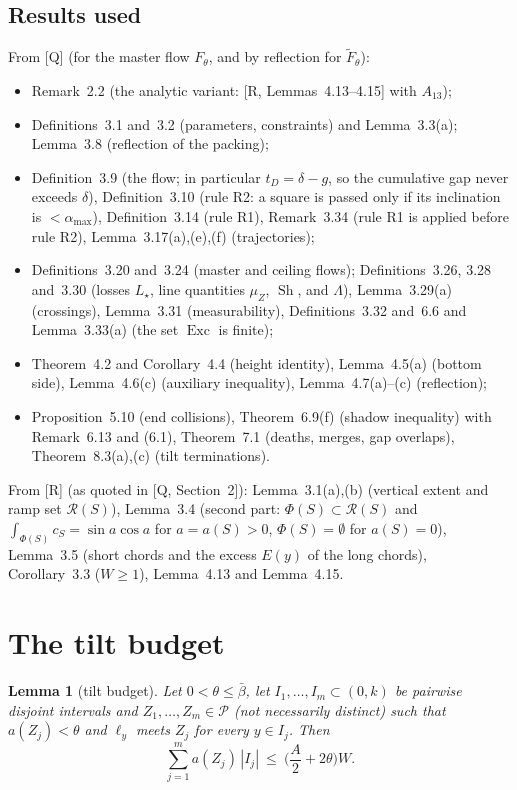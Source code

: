 \documentclass[11pt]{amsart}
\newcommand{\cP}{\mathcal P}
\newcommand{\cR}{\mathcal R}
\newcommand{\Sh}{\operatorname{Sh}}
\newcommand{\Exc}{\operatorname{Exc}}
\newcommand{\amax}{\alpha_{\max}}
\newcommand{\bbar}{\bar\beta}
\newcommand{\Lam}{\Lambda}
\newtheorem{lemma}[theorem]{Lemma}
\theoremstyle{definition}
\theoremstyle{remark}
\numberwithin{equation}{section}
\begin{document}
\subsection{Results used}
From [Q] (for the master flow $F_\theta$, and by reflection for $\tilde F_\theta$):
\begin{itemize}
\item Remark~2.2 (the analytic variant: [R, Lemmas~4.13--4.15] with $A_{13}$);
\item Definitions~3.1 and~3.2 (parameters, constraints) and Lemma~3.3(a); Lemma~3.8 (reflection of the packing);
\item Definition~3.9 (the flow; in particular $t_D=\delta-g$, so the cumulative gap never exceeds $\delta$), Definition~3.10
(rule R2: a square is passed only if its inclination is $<\amax$), Definition~3.14 (rule R1), Remark~3.34 (rule R1 is
applied before rule R2), Lemma~3.17(a),(e),(f) (trajectories);
\item Definitions~3.20 and~3.24 (master and ceiling flows); Definitions~3.26, 3.28 and~3.30 (losses $L_\star$, line
quantities $\mu_Z$, $\Sh$, and $\Lam$), Lemma~3.29(a) (crossings), Lemma~3.31 (measurability), Definitions~3.32 and~6.6
and Lemma~3.33(a) (the set $\Exc$ is finite);
\item Theorem~4.2 and Corollary~4.4 (height identity), Lemma~4.5(a) (bottom side), Lemma~4.6(c) (auxiliary inequality),
Lemma~4.7(a)--(c) (reflection);
\item Proposition~5.10 (end collisions), Theorem~6.9(f) (shadow inequality) with Remark~6.13 and (6.1), Theorem~7.1
(deaths, merges, gap overlaps), Theorem~8.3(a),(c) (tilt terminations).
\end{itemize}
From [R] (as quoted in [Q, Section~2]): Lemma~3.1(a),(b) (vertical extent and ramp set $\cR(S)$), Lemma~3.4 (second part:
$\Phi(S)\subset\cR(S)$ and $\int_{\Phi(S)}c_S=\sin a\cos a$ for $a=a(S)>0$, $\Phi(S)=\emptyset$ for $a(S)=0$), Lemma~3.5
(short chords and the excess $E(y)$ of the long chords), Corollary~3.3 ($W\ge1$), Lemma~4.13 and Lemma~4.15.

\section{The tilt budget}\label{sec:tilt}

\begin{lemma}[tilt budget]\label{lem:tilt}
Let $0<\theta\le\bbar$, let $I_1,\dots,I_m\subset(0,k)$ be pairwise disjoint intervals and $Z_1,\dots,Z_m\in\cP$
\textup{(}not necessarily distinct\textup{)} such that $a(Z_j)<\theta$ and $\ell_y$ meets $Z_j$ for every $y\in I_j$. Then
\[
\sum_{j=1}^ma(Z_j)\,|I_j|\ \le\ \Big(\frac A2+2\theta\Big)W .
\]
\end{lemma}
\end{document}
